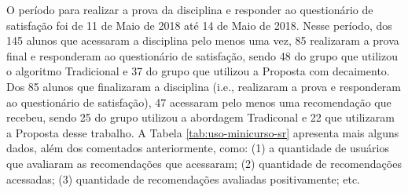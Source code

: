 O período para realizar a prova da disciplina e responder ao questionário de satisfação foi de 11 de Maio de 2018 até
14 de Maio de 2018. Nesse período, dos 145 alunos que acessaram a disciplina pelo menos uma vez, 85 realizaram a prova final e responderam ao
questionário de satisfação, sendo 48 do grupo que utilizou o algoritmo Tradicional e 37 do grupo que utilizou a Proposta
com decaimento. Dos 85 alunos que finalizaram a disciplina (i.e., realizaram a prova e responderam ao questionário de
satisfação), 47 acessaram pelo menos uma recomendação que recebeu, sendo 25 do grupo utilizou a abordagem Tradiconal e
22 que utilizaram a Proposta desse trabalho. A Tabela \ref{tab:uso-minicurso-sr} apresenta mais alguns dados, além dos
comentados anteriormente, como: (1) a quantidade de usuários que avaliaram as recomendações que acessaram;
(2) quantidade de recomendações acessadas; (3) quantidade de recomendações avaliadas positivamente; etc.

